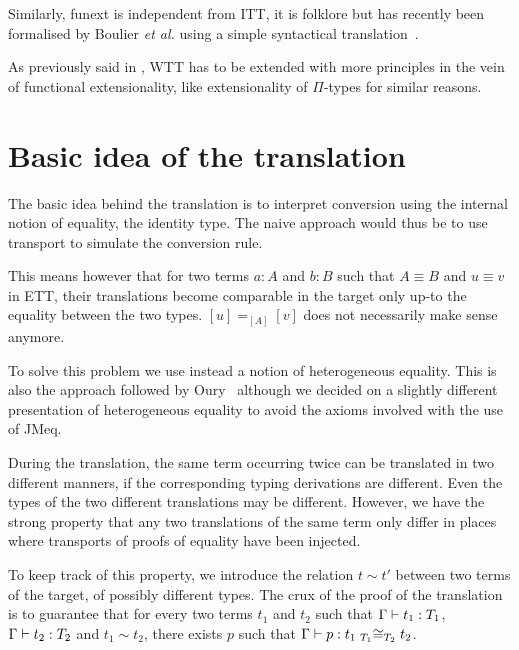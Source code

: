 Similarly, \acrshort{funext} is independent from \acrshort{ITT}, it is folklore
but has recently been formalised by Boulier \emph{et al.} using a simple
syntactical translation~.

As previously said in , \acrshort{WTT} has to be extended with
more principles in the vein of functional extensionality, like extensionality
of \(\Pi\)-types for similar reasons.

\section{Basic idea of the translation}

The basic idea behind the translation is to interpret conversion using the
internal notion of equality, \ie the identity type.
The naive approach would thus be to use transport to simulate the conversion
rule.

This means however that for two terms \(a : A\) and \(b : B\) such that
\(A \equiv B\) and \(u \equiv v\) in \acrshort{ETT}, their translations
become comparable in the target only up-to the equality
between the two types. \([u] =_{[A]} [v]\) does not necessarily make sense
anymore.

To solve this problem we use instead a notion of heterogeneous equality.
This is also the approach followed by
Oury~
although we decided on a slightly different presentation of heterogeneous
equality to avoid the axioms involved with the use of \acrshort{JMeq}.

During the translation, the same term occurring twice can be
translated in two different manners, if the corresponding typing
derivations are different. Even the types of the two different
translations may be different.
%
However, we have the strong property that any two translations of the
same term only differ in places where transports of proofs of equality have been
injected.

To keep track of this property, we introduce the relation $t \sim t'$
between two terms of the target, of possibly different
types.
%
The crux of the proof of the translation is to guarantee that for
every two terms $t_1$ and $t_2$ such that $\isterm{\Ga}{t_1}{T_1}$,
$\isterm{\Ga}{t_2}{T_2}$ and $t_1 \sim t_2$, there exists $p$ such that
$\isterm{\Ga} {p} {\Heq{{T_1}} {{t_1}} {{T_2}} {{t_2}}}$.

